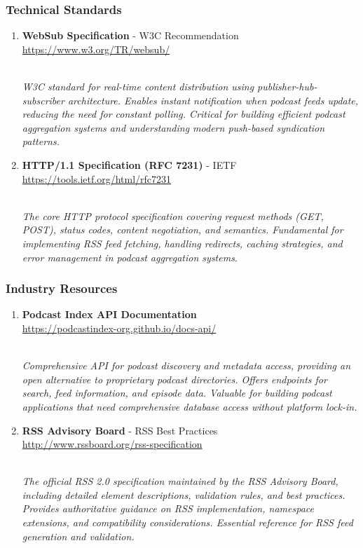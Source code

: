 \documentclass[
  letterpaper,
  DIV=11,
  numbers=noendperiod]{scrartcl}
\begin{document}
\subsubsection{Technical Standards}\label{technical-standards}

\begin{enumerate}
\def\labelenumi{\arabic{enumi}.}
\setcounter{enumi}{3}
\item
  \textbf{WebSub Specification} - W3C Recommendation\\
  \url{https://www.w3.org/TR/websub/}\strut \\
  \emph{W3C standard for real-time content distribution using
  publisher-hub-subscriber architecture. Enables instant notification
  when podcast feeds update, reducing the need for constant polling.
  Critical for building efficient podcast aggregation systems and
  understanding modern push-based syndication patterns.}
\item
  \textbf{HTTP/1.1 Specification (RFC 7231)} - IETF\\
  \url{https://tools.ietf.org/html/rfc7231}\strut \\
  \emph{The core HTTP protocol specification covering request methods
  (GET, POST), status codes, content negotiation, and semantics.
  Fundamental for implementing RSS feed fetching, handling redirects,
  caching strategies, and error management in podcast aggregation
  systems.}
\end{enumerate}

\subsubsection{Industry Resources}\label{industry-resources}

\begin{enumerate}
\def\labelenumi{\arabic{enumi}.}
\setcounter{enumi}{5}
\item
  \textbf{Podcast Index API Documentation}\\
  \url{https://podcastindex-org.github.io/docs-api/}\strut \\
  \emph{Comprehensive API for podcast discovery and metadata access,
  providing an open alternative to proprietary podcast directories.
  Offers endpoints for search, feed information, and episode data.
  Valuable for building podcast applications that need comprehensive
  database access without platform lock-in.}
\item
  \textbf{RSS Advisory Board} - RSS Best Practices\\
  \url{http://www.rssboard.org/rss-specification}\strut \\
  \emph{The official RSS 2.0 specification maintained by the RSS
  Advisory Board, including detailed element descriptions, validation
  rules, and best practices. Provides authoritative guidance on RSS
  implementation, namespace extensions, and compatibility
  considerations. Essential reference for RSS feed generation and
  validation.}
\end{enumerate}
\end{document}

